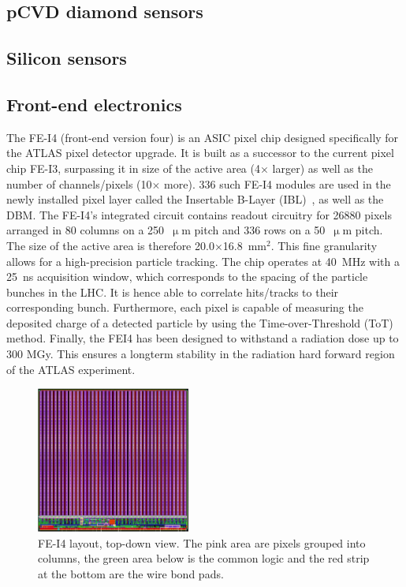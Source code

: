 \documentclass[12pt]{packages/mytustyle}  %
\begin{document}
\subsection{pCVD diamond sensors}
\subsection{Silicon sensors}


\subsection{Front-end electronics}
The FE-I4 (front-end version four) is an ASIC pixel chip designed specifically for the ATLAS pixel detector upgrade. It is built as a successor to the current pixel chip FE-I3, surpassing it in size of the active area (4$\times$ larger) as well as the number of channels/pixels (10$\times$ more). 336 such FE-I4 modules are used in the newly installed pixel layer called the Insertable B-Layer (IBL)~\cite{}, as well as the DBM. The FE-I4's integrated circuit contains readout circuitry for 26880 pixels arranged in 80 columns on a 250~$\upmu$m pitch and 336 rows on a 50~$\upmu$m pitch. The size of the active area is therefore 20.0$\times$16.8~mm$^2$. This fine granularity allows for a high-precision particle tracking. The chip operates at 40~MHz with a 25~ns acquisition window, which corresponds to the spacing of the particle bunches in the LHC. It is hence able to correlate hits/tracks to their corresponding bunch. Furthermore, each pixel is capable of measuring the deposited charge of a detected particle by using the Time-over-Threshold (ToT) method. Finally, the FEI4 has been designed to withstand a radiation dose up to 300 MGy. This ensures a longterm stability in the radiation hard forward region of the ATLAS experiment.

\begin{figure}[!t]
\centering
\includegraphics[width=0.45\textwidth]{pics/fei41}
\caption{FE-I4 layout, top-down view. The pink area are pixels grouped into columns, the green area below is the common logic and the red strip at the bottom are the wire bond pads.}
\label{fig:anapix}
\end{figure}
\end{document}
